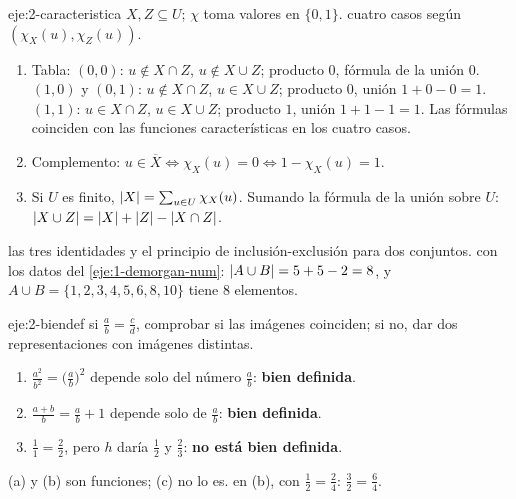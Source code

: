 \begin{solucion}{eje:2-caracteristica}
\datos $X,Z\subseteq U$; $\chi$ toma valores en $\{0,1\}$.
\planteamiento cuatro casos según $(\chi_X(u),\chi_Z(u))$.
\pasos
\begin{enumerate}[label=\arabic*.]
  \item Tabla: $(0,0)$: $u\notin X\cap Z$, $u\notin X\cup Z$; producto $0$, fórmula de la unión $0$. $(1,0)$ y $(0,1)$: $u\notin X\cap Z$, $u\in X\cup Z$; producto $0$, unión $1+0-0=1$. $(1,1)$: $u\in X\cap Z$, $u\in X\cup Z$; producto $1$, unión $1+1-1=1$. Las fórmulas coinciden con las funciones características en los cuatro casos.
  \item Complemento: $u\in\overline{X}\iff\chi_X(u)=0\iff1-\chi_X(u)=1$.
  \item Si $U$ es finito, $\lvert X\rvert=\sum_{u\in U}\chi_X(u)$. Sumando la fórmula de la unión sobre $U$: $\lvert X\cup Z\rvert=\lvert X\rvert+\lvert Z\rvert-\lvert X\cap Z\rvert$.
\end{enumerate}
\resultado las tres identidades y el principio de inclusión-exclusión para dos conjuntos.
\comprobacion con los datos del \cref{eje:1-demorgan-num}: $\lvert A\cup B\rvert=5+5-2=8$, y $A\cup B=\{1,2,3,4,5,6,8,10\}$ tiene 8 elementos.
\end{solucion}

\begin{solucion}{eje:2-biendef}
\planteamiento si $\tfrac ab=\tfrac cd$, comprobar si las imágenes coinciden; si no, dar dos representaciones con imágenes distintas.
\pasos
\begin{enumerate}[label=(\alph*)]
  \item $\tfrac{a^{2}}{b^{2}}=\bigl(\tfrac ab\bigr)^{2}$ depende solo del número $\tfrac ab$: \textbf{bien definida}.
  \item $\tfrac{a+b}{b}=\tfrac ab+1$ depende solo de $\tfrac ab$: \textbf{bien definida}.
  \item $\tfrac11=\tfrac22$, pero $h$ daría $\tfrac12$ y $\tfrac23$: \textbf{no está bien definida}.
\end{enumerate}
\resultado (a) y (b) son funciones; (c) no lo es.
\comprobacion en (b), con $\tfrac12=\tfrac24$: $\tfrac{3}{2}=\tfrac{6}{4}$.
\end{solucion}

